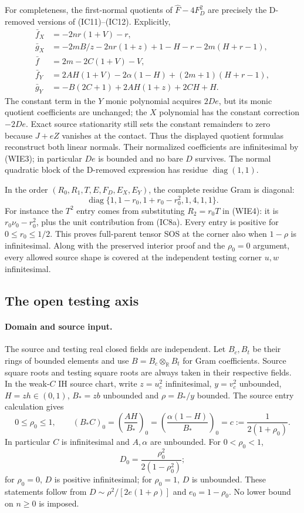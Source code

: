 For completeness, the first-normal quotients of
$\widehat F-4F_D^2$ are precisely the D-removed versions of
(IC11)--(IC12). Explicitly,
\begin{align*}
 \bar f_X&=-2nr(1+V)-r,\\
 \bar g_X&=-2mB/z-2nr(1+z)+1-H-r-2m(H+r-1),\\
 \bar f&=2m-2C(1+V)-V,\\
 \bar f_Y&=2AH(1+V)-2\alpha(1-H)+(2m+1)(H+r-1),\\
 \bar g_Y&=-B(2C+1)+2AH(1+z)+2CH+H.
\end{align*}
The constant term in the $Y$ monic polynomial acquires $2De$, but
its monic quotient coefficients are unchanged; the $X$ polynomial
has the constant correction $-2De$. Exact source stationarity
still sets the constant remainders to zero because $J+eZ$ vanishes
at the contact. Thus the displayed quotient formulas reconstruct
both linear normals. Their normalized coefficients are infinitesimal
by (WIE3); in particular $De$ is bounded and no bare $D$ survives.
The normal quadratic block of the D-removed expression has residue
$\operatorname{diag}(1,1)$.

In the order $(R_0,R_1,T,E,F_D,E_X,E_Y)$, the complete residue Gram
is diagonal:
\[
 \operatorname{diag}\{1,1-r_0,1+r_0-r_0^2,1,4,1,1\}.
\tag{WIE6}
\]
For instance the $T^2$ entry comes from substituting $R_2=r_0T$
in (WIE4): it is $r_0\nu_0-r_0^2$, plus the unit contribution from
(IC8a). Every entry is positive for $0\le r_0\le1/2$.
This proves full-parent tensor SOS at the corner also when
$1-\rho$ is infinitesimal. Along with the preserved interior proof
and the $\rho_0=0$ argument, every allowed source shape is covered
at the independent testing corner $u,w$ infinitesimal.

\subsection{The open testing axis}
\label{component:pf95b1c5fc32f}

\label{pf95b1c5fc32f:sec:weak-ih-open-axis}
\paragraph{Domain and source input.}
The source and testing real closed fields are independent.  Let $B_c,B_t$
be their rings of bounded elements and use $B=B_c\otimes_{\mathbb R}B_t$
for Gram coefficients.  Source square roots and testing square roots are
always taken in their respective fields.  In the weak-$C$ IH source chart,
write $z=u_c^2$ infinitesimal, $y=v_c^2$ unbounded,
$H=zh\in(0,1)$, $B_*=zb$ unbounded and $\rho=B_*/y$ bounded.
The source entry calculation gives
\[
 0\leq\rho_0\leq1,\qquad
 (B_*C)_0=\left(\frac{AH}{B_*}\right)_0
 =\left(\frac{\alpha(1-H)}{B_*}\right)_0
 =c:=\frac1{2(1+\rho_0)}.
\tag{OA1}
\]
In particular $C$ is infinitesimal and $A,\alpha$ are unbounded.
For $0<\rho_0<1$,
\[
 D_0=\frac{\rho_0^2}{2(1-\rho_0^2)};
\tag{OA2}
\]
for $\rho_0=0$, $D$ is positive infinitesimal; for $\rho_0=1$, $D$ is
unbounded.  These statements follow from
$D\sim\rho^2/[2e(1+\rho)]$ and $e_0=1-\rho_0$.
No lower bound on $n\geq0$ is imposed.


